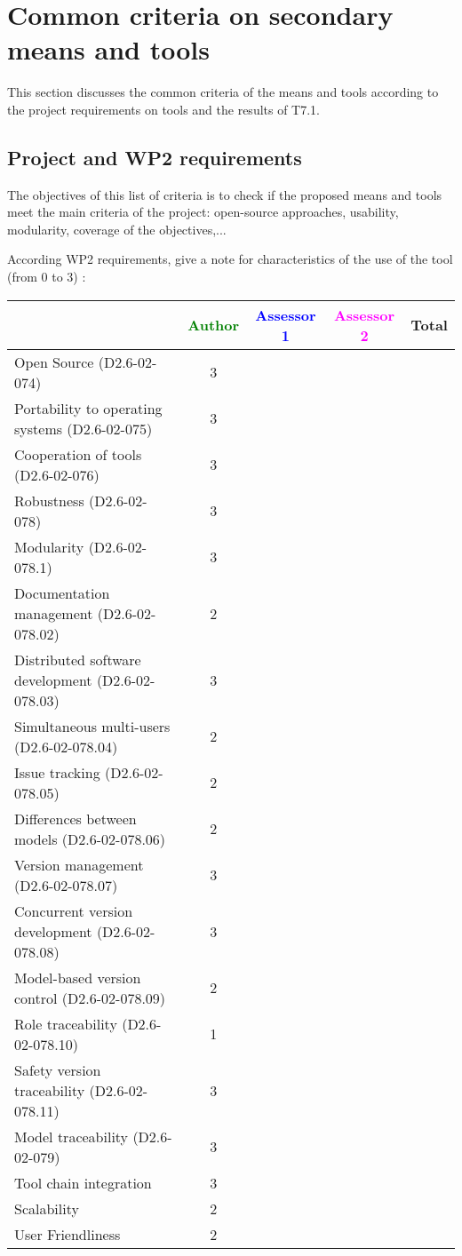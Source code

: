 \section{Common criteria on secondary means and tools}
\label{common}
This section discusses the common criteria of the means and tools according to the project requirements on tools and the results of T7.1.

\subsection{Project and WP2 requirements}

The objectives of this list of criteria is to check if the proposed means and tools meet the main criteria of the project: open-source approaches, usability, modularity, coverage of the objectives,...

According WP2 requirements, give a note for characteristics of the use of the tool (from 0 to 3) :

\begin{tabular}{|l | c | c | c | c|}
\hline
& \textcolor{green}{Author} & \textcolor{blue}{Assessor 1} & \textcolor{magenta}{Assessor 2} & Total \\
\hline
Open Source (D2.6-02-074) & 3 & & &  \\
\hline
Portability to operating systems (D2.6-02-075) & 3 & & &  \\
\hline
Cooperation of tools (D2.6-02-076) & 3 & & &  \\
\hline
Robustness (D2.6-02-078) & 3 & & & \\
\hline
Modularity (D2.6-02-078.1) & 3 & & & \\
\hline
Documentation management (D2.6-02-078.02) & 2 & & & \\
\hline
Distributed software development (D2.6-02-078.03)  & 3 & & & \\
\hline
Simultaneous multi-users (D2.6-02-078.04)   & 2 & & & \\
\hline
Issue tracking (D2.6-02-078.05) & 2 & & & \\
\hline
Differences between models (D2.6-02-078.06) & 2 & & & \\
\hline
Version management (D2.6-02-078.07) & 3 & & & \\
\hline
Concurrent version development (D2.6-02-078.08) & 3 & & & \\
\hline
Model-based version control (D2.6-02-078.09) & 2 & & & \\
\hline
Role traceability (D2.6-02-078.10) & 1 & & & \\
\hline
Safety version traceability (D2.6-02-078.11) & 3 & & & \\
\hline
Model traceability (D2.6-02-079) & 3 & & & \\
\hline
Tool chain integration & 3 & & & \\
\hline
Scalability & 2 & & & \\
\hline
User Friendliness & 2 & & & \\
\hline
\end{tabular}


